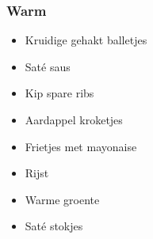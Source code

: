 \subsubsection{Warm}
\begin{itemize}
	\item	Kruidige gehakt balletjes
	\item	Saté saus
	\item	Kip spare ribs
	\item	Aardappel kroketjes
	\item	Frietjes met mayonaise
	\item	Rijst
	\item	Warme groente
	\item	Saté stokjes
\end{itemize}
